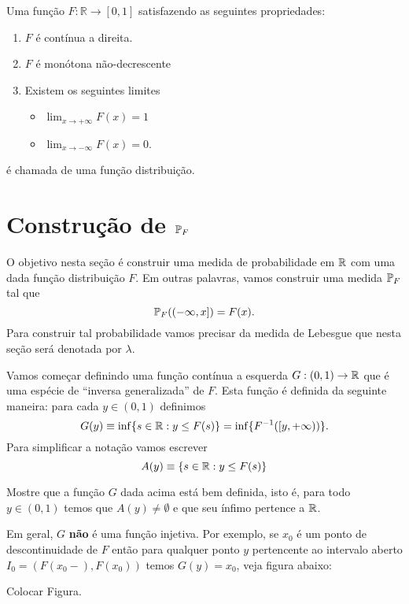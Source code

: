 \begin{definicao}
Uma função $F:\mathbb{R}\to [0,1]$ satisfazendo 
as seguintes propriedades:
\begin{enumerate}
	\item	
	$F$ é contínua a direita.
	
	\item
	$F$ é monótona não-decrescente	
		
	\item 
	Existem os seguintes limites 
		\begin{itemize}
			\item 
 			$\displaystyle\lim_{x\to+\infty} F(x)=1$		
			
			\item
			$\displaystyle\lim_{x\to -\infty} F(x)=0$.
		\end{itemize}
\end{enumerate}
é chamada de uma função distribuição.
\end{definicao}






\section{Construção de $\P_{F}$}

O objetivo nesta seção é construir uma 
medida de probabilidade em $\R$ com uma 
dada função distribuição $F$. 
Em outras palavras, vamos construir
uma medida $\P_F$ tal que 
\[
	\P_{F}((-\infty,x]) = F(x).
\]
Para construir tal probabilidade
vamos precisar da medida de Lebesgue que 
nesta seção será denotada por $\lambda$.


Vamos começar definindo uma função contínua a 
esquerda $G:(0,1)\to\R$ que é uma espécie de 
``inversa generalizada'' de $F$.
Esta função é definida da seguinte maneira:
para cada $y\in (0,1)$ definimos 
	\[
		G(y)
		\equiv 
		\inf\{ s\in\R: y\leq F(s)\} 
		= 
		\inf \{ F^{-1}([y,+\infty))\}.
	\]
Para simplificar a notação vamos escrever
	\[
	 	A(y)\equiv \{ s\in\R: y\leq F(s)\}
	\]	

\begin{exercicio}
 Mostre que a função $G$ dada acima está bem definida,
 isto é, para todo $y\in (0,1)$ temos que 
 $A(y)\neq \emptyset$ e que seu ínfimo pertence a $\R$.
\end{exercicio}

\begin{observacao}
Em geral, $G$ {\bf não} é uma função injetiva. 
Por exemplo, se 
$x_0$ é um ponto de descontinuidade de $F$ então 
para qualquer ponto $y$ pertencente ao 
intervalo aberto $I_0=(F(x_0-),F(x_0))$ temos  
$G(y)=x_0$, veja figura abaixo:
\begin{center}
{\red Colocar Figura.}
\end{center}
\end{observacao}

